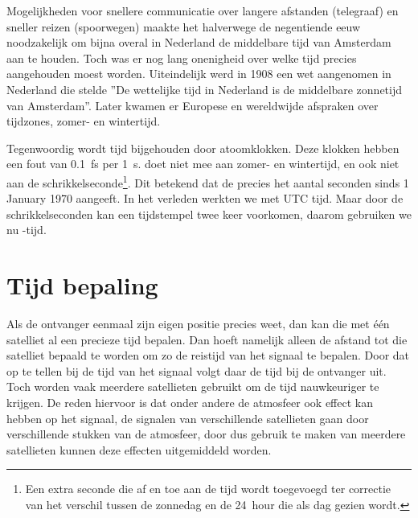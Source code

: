 Mogelijkheden voor snellere communicatie over langere afstanden
(telegraaf) en sneller reizen (spoorwegen) maakte het halverwege de
negentiende eeuw noodzakelijk om bijna overal in Nederland de middelbare
tijd van Amsterdam aan te houden. Toch was er nog lang onenigheid over
welke tijd precies aangehouden moest worden. Uiteindelijk werd in 1908
een wet aangenomen in Nederland die stelde ''De wettelijke tijd in
Nederland is de middelbare zonnetijd van Amsterdam''. Later kwamen er
Europese en wereldwijde afspraken over tijdzones, zomer- en wintertijd.

Tegenwoordig wordt tijd bijgehouden door atoomklokken. Deze klokken
hebben een fout van \SI{0.1}{\femto\second} per \SI{1}{\second}. \gps
doet niet mee aan zomer- en wintertijd, en ook niet aan de
schrikkelseconde\footnote{Een extra seconde die af en toe aan de tijd
wordt toegevoegd ter correctie van het verschil tussen de zonnedag en de
\SI{24}{hour} die als dag gezien wordt.}. Dit betekend dat de \gps
precies het aantal seconden sinds 1 January 1970 aangeeft. In het
verleden werkten we met UTC tijd. Maar door de schrikkelseconden kan een
tijdstempel twee keer voorkomen, daarom gebruiken we nu \gps-tijd.


\section{Tijd bepaling}

Als de ontvanger eenmaal zijn eigen positie precies weet, dan kan die
met één satelliet al een precieze tijd bepalen. Dan hoeft namelijk
alleen de afstand tot die satelliet bepaald te worden om zo de reistijd
van het signaal te bepalen. Door dat op te tellen bij de tijd van het
signaal volgt daar de tijd bij de ontvanger uit. Toch worden vaak
meerdere satellieten gebruikt om de tijd nauwkeuriger te krijgen. De
reden hiervoor is dat onder andere de atmosfeer ook effect kan hebben op
het signaal, de signalen van verschillende satellieten gaan door
verschillende stukken van de atmosfeer, door dus gebruik te maken van
meerdere satellieten kunnen deze effecten uitgemiddeld worden.

